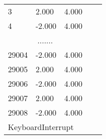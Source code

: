 \documentclass{article}
\begin{document}
\begin{itemize}
\begin{table}[]
\begin{tabular}{|lll|ll}
        \multicolumn{1}{|l|}{3}             & \multicolumn{1}{l|}{2.000}      & 4.000         &  &  \\ \cline{1-3}
        \multicolumn{1}{|l|}{4}             & \multicolumn{1}{l|}{-2.000}     & 4.000         &  &  \\ \cline{1-3}
        \multicolumn{3}{|c|}{.......}                                                         &  &  \\ \cline{1-3}
        \multicolumn{1}{|l|}{29004}         & \multicolumn{1}{l|}{-2.000}     & 4.000         &  &  \\ \cline{1-3}
        \multicolumn{1}{|l|}{29005}         & \multicolumn{1}{l|}{2.000}      & 4.000         &  &  \\ \cline{1-3}
        \multicolumn{1}{|l|}{29006}         & \multicolumn{1}{l|}{-2.000}     & 4.000         &  &  \\ \cline{1-3}
        \multicolumn{1}{|l|}{29007}         & \multicolumn{1}{l|}{2.000}      & 4.000         &  &  \\ \cline{1-3}
        \multicolumn{1}{|l|}{29008}         & \multicolumn{1}{l|}{-2.000}     & 4.000         &  &  \\ \cline{1-3}
        \multicolumn{3}{|l|}{KeyboardInterrupt}                                               &  &  \\ \cline{1-3}
        \end{tabular}
        \end{table}
    

\end{itemize}
\end{document}
